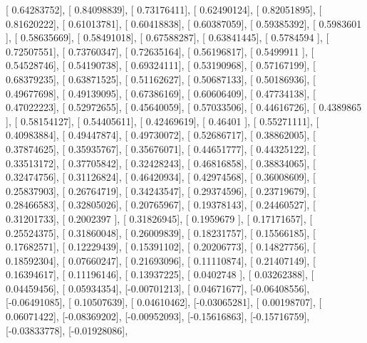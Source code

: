 \documentclass{article}
\begin{document}
       [ 0.64283752],
       [ 0.84098839],
       [ 0.73176411],
       [ 0.62490124],
       [ 0.82051895],
       [ 0.81620222],
       [ 0.61013781],
       [ 0.60418838],
       [ 0.60387059],
       [ 0.59385392],
       [ 0.5983601 ],
       [ 0.58635669],
       [ 0.58491018],
       [ 0.67588287],
       [ 0.63841445],
       [ 0.5784594 ],
       [ 0.72507551],
       [ 0.73760347],
       [ 0.72635164],
       [ 0.56196817],
       [ 0.5499911 ],
       [ 0.54528746],
       [ 0.54190738],
       [ 0.69324111],
       [ 0.53190968],
       [ 0.57167199],
       [ 0.68379235],
       [ 0.63871525],
       [ 0.51162627],
       [ 0.50687133],
       [ 0.50186936],
       [ 0.49677698],
       [ 0.49139095],
       [ 0.67386169],
       [ 0.60606409],
       [ 0.47734138],
       [ 0.47022223],
       [ 0.52972655],
       [ 0.45640059],
       [ 0.57033506],
       [ 0.44616726],
       [ 0.4389865 ],
       [ 0.58154127],
       [ 0.54405611],
       [ 0.42469619],
       [ 0.46401   ],
       [ 0.55271111],
       [ 0.40983884],
       [ 0.49447874],
       [ 0.49730072],
       [ 0.52686717],
       [ 0.38862005],
       [ 0.37874625],
       [ 0.35935767],
       [ 0.35676071],
       [ 0.44651777],
       [ 0.44325122],
       [ 0.33513172],
       [ 0.37705842],
       [ 0.32428243],
       [ 0.46816858],
       [ 0.38834065],
       [ 0.32474756],
       [ 0.31126824],
       [ 0.46420934],
       [ 0.42974568],
       [ 0.36008609],
       [ 0.25837903],
       [ 0.26764719],
       [ 0.34243547],
       [ 0.29374596],
       [ 0.23719679],
       [ 0.28466583],
       [ 0.32805026],
       [ 0.20765967],
       [ 0.19378143],
       [ 0.24460527],
       [ 0.31201733],
       [ 0.2002397 ],
       [ 0.31826945],
       [ 0.1959679 ],
       [ 0.17171657],
       [ 0.25524375],
       [ 0.31860048],
       [ 0.26009839],
       [ 0.18231757],
       [ 0.15566185],
       [ 0.17682571],
       [ 0.12229439],
       [ 0.15391102],
       [ 0.20206773],
       [ 0.14827756],
       [ 0.18592304],
       [ 0.07660247],
       [ 0.21693096],
       [ 0.11110874],
       [ 0.21407149],
       [ 0.16394617],
       [ 0.11196146],
       [ 0.13937225],
       [ 0.0402748 ],
       [ 0.03262388],
       [ 0.04459456],
       [ 0.05934354],
       [-0.00701213],
       [ 0.04671677],
       [-0.06408556],
       [-0.06491085],
       [ 0.10507639],
       [ 0.04610462],
       [-0.03065281],
       [ 0.00198707],
       [ 0.06071422],
       [-0.08369202],
       [-0.00952093],
       [-0.15616863],
       [-0.15716759],
       [-0.03833778],
       [-0.01928086],
\end{document}
